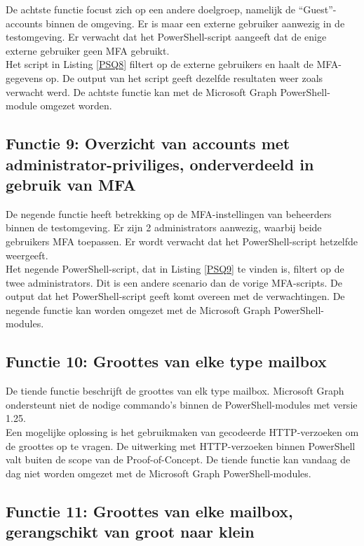 De achtste functie focust zich op een andere doelgroep, namelijk de “Guest”-accounts binnen de omgeving. Er is maar een externe gebruiker aanwezig in de testomgeving. Er verwacht dat het PowerShell-script aangeeft dat de enige externe gebruiker geen \ac{MFA} gebruikt. \\

Het script in Listing \ref{PSQ8} filtert op de externe gebruikers en haalt de \ac{MFA}-gegevens op. De output van het script geeft dezelfde resultaten weer zoals verwacht werd. De achtste functie kan met de Microsoft Graph PowerShell-module omgezet worden.

\subsection{Functie 9: Overzicht van accounts met administrator-priviliges, onderverdeeld in gebruik van MFA}

De negende functie heeft betrekking op de \ac{MFA}-instellingen van beheerders binnen de testomgeving. Er zijn 2 administrators aanwezig, waarbij beide gebruikers \ac{MFA} toepassen. Er wordt verwacht dat het PowerShell-script hetzelfde weergeeft. \\

Het negende PowerShell-script, dat in Listing \ref{PSQ9} te vinden is, filtert op de twee administrators. Dit is een andere scenario dan de vorige \ac{MFA}-scripts. De output dat het PowerShell-script geeft komt overeen met de verwachtingen. De negende functie kan worden omgezet met de Microsoft Graph PowerShell-modules.

\subsection{Functie 10: Groottes van elke type mailbox}

De tiende functie beschrijft de groottes van elk type mailbox. Microsoft Graph ondersteunt niet de nodige commando's binnen de PowerShell-modules met versie 1.25. \\

Een mogelijke oplossing is het gebruikmaken van gecodeerde \ac{HTTP}-verzoeken om de groottes op te vragen. De uitwerking met \ac{HTTP}-verzoeken binnen PowerShell valt buiten de scope van de Proof-of-Concept. De tiende functie kan vandaag de dag niet worden omgezet met de Microsoft Graph PowerShell-modules.

\subsection{Functie 11: Groottes van elke mailbox, gerangschikt van groot naar klein}

